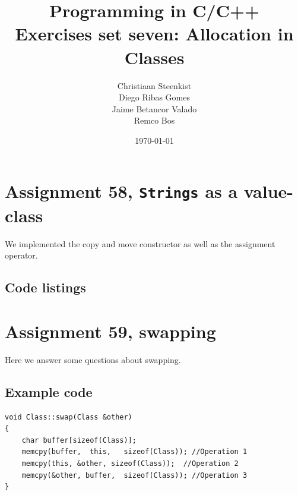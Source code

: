 \documentclass[11pt]{article}
\begin{document}
\title{Programming in C/C++ \\
       Exercises set seven: Allocation in Classes
}
\date{\today}
\author{Christiaan Steenkist \\
Diego Ribas Gomes \\
Jaime Betancor Valado \\
Remco Bos \\
}

\maketitle

\section*{Assignment 58, \texttt{Strings} as a value-class}
We implemented the copy and move constructor as well as the assignment operator.

\subsection*{Code listings}







\section*{Assignment 59, swapping}
Here we answer some questions about swapping.

\subsection*{Example code}
\begin{lstlisting}
void Class::swap(Class &other)
{
	char buffer[sizeof(Class)];
	memcpy(buffer,  this,   sizeof(Class)); //Operation 1
	memcpy(this, &other, sizeof(Class));  //Operation 2
	memcpy(&other, buffer,  sizeof(Class)); //Operation 3	
}
\end{lstlisting}
\end{document}
